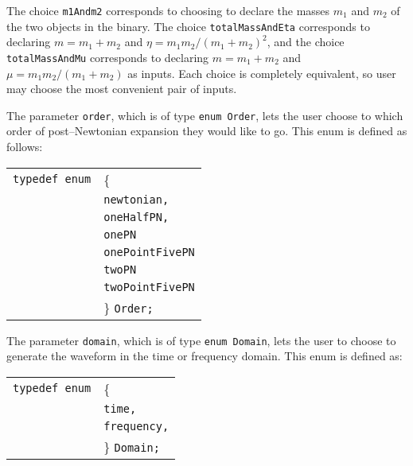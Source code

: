 \documentclass[12pt]{article}
\begin{document}
\vspace{5mm}

The choice \texttt{m1Andm2} corresponds to choosing to declare the masses $m_{1}$ and $m_{2}$ of the two objects in the binary. The choice \texttt{totalMassAndEta} corresponds to declaring $m=m_{1}+m_{2}$ and $\eta=m_{1}m_{2}/(m_{1}+m_{2})^{2}$, and the choice \texttt{totalMassAndMu} corresponds to declaring $m=m_{1}+m_{2}$ and $\mu=m_{1}m_{2}/(m_{1}+m_{2})$ as inputs. Each choice is completely equivalent, so user may choose the most convenient pair of inputs.

The parameter \texttt{order}, which is of type \texttt{enum Order}, lets the user choose to which order of post--Newtonian expansion they would like to go. This enum is defined as follows:

\vspace{5mm}

\begin{tabular}{ll}
\texttt{typedef enum} & \{ \\
                      & \texttt{newtonian,} \\
                      & \texttt{oneHalfPN,}  \\
                      & \texttt{onePN} \\
                      & \texttt{onePointFivePN} \\
                      & \texttt{twoPN} \\
                      & \texttt{twoPointFivePN} \\
                      & \} \texttt{Order;}
\end{tabular}

\vspace{5mm}


The parameter \texttt{domain}, which is of type \texttt{enum Domain}, lets the user to choose to generate the waveform in the time or frequency domain. This enum is defined as:

\vspace{5mm}

\begin{tabular}{ll}
\texttt{typedef enum} & \{ \\
                      & \texttt{time,} \\
                      & \texttt{frequency,}  \\
                      & \} \texttt{Domain;}
\end{tabular}

\vspace{5mm}
\end{document}
